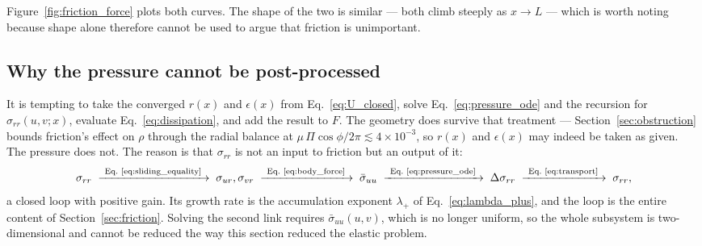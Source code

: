 \documentclass[11pt]{article}
\begin{document}
Figure~\ref{fig:friction_force} plots both curves. The shape of the two is
similar --- both climb steeply as $x \to L$ --- which is worth noting because
shape alone therefore cannot be used to argue that friction is unimportant.

\subsection{Why the pressure cannot be post-processed}\label{sec:loop}
It is tempting to
take the converged $r(x)$ and $\epsilon(x)$ from Eq.~\eqref{eq:U_closed}, solve
Eq.~\eqref{eq:pressure_ode} and the recursion for
$\sigma_{rr}\left(u,v;x\right)$, evaluate Eq.~\eqref{eq:dissipation}, and add the
result to $F$. The geometry does survive that treatment ---
Section~\ref{sec:obstruction} bounds friction's effect on $\rho$ through the
radial balance at $\mu\,\Pi\cos\phi/2\pi \lesssim 4\times10^{-3}$, so $r(x)$ and
$\epsilon(x)$ may indeed be taken as given. The pressure does not. The reason is
that $\sigma_{rr}$ is not an input to friction but an output of it:
\begin{equation}\label{eq:friction_loop}
    \sigma_{rr}
    \;\xrightarrow{\ \text{Eq.~\eqref{eq:sliding_equality}}\ }\;
    \sigma_{ur},\sigma_{vr}
    \;\xrightarrow{\ \text{Eq.~\eqref{eq:body_force}}\ }\;
    \bar\sigma_{uu}
    \;\xrightarrow{\ \text{Eq.~\eqref{eq:pressure_ode}}\ }\;
    \Delta\sigma_{rr}
    \;\xrightarrow{\ \text{Eq.~\eqref{eq:transport}}\ }\;
    \sigma_{rr},
\end{equation}
a closed loop with positive gain. Its growth rate is the accumulation exponent
$\lambda_{+}$ of Eq.~\eqref{eq:lambda_plus}, and the loop is the entire content
of Section~\ref{sec:friction}. Solving the second link requires
$\bar\sigma_{uu}\left(u,v\right)$, which is no longer uniform, so the whole
subsystem is two-dimensional and cannot be reduced the way this section reduced
the elastic problem.
\end{document}
